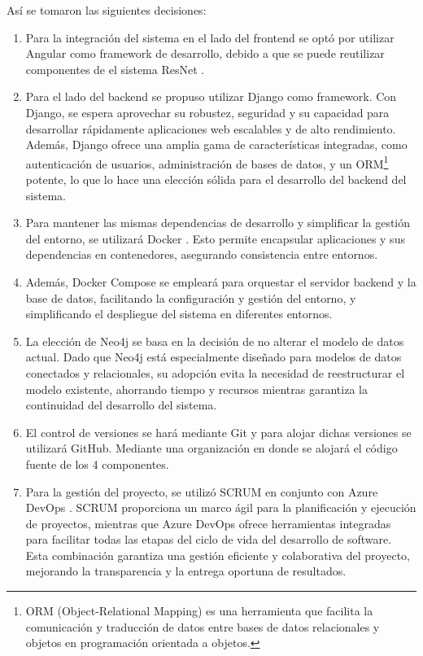 \begin{itemize}
    Así se tomaron las siguientes decisiones:
    \begin{enumerate}
        \item Para la integración del sistema  en el lado del frontend se optó por utilizar Angular como framework de desarrollo, debido a que se puede reutilizar componentes de el sistema ResNet \cite{RESNET}. 
        \item Para el lado del backend se propuso utilizar Django como framework. Con Django, se espera aprovechar su robustez, seguridad y su capacidad para desarrollar rápidamente aplicaciones web escalables y de alto rendimiento. Además, Django ofrece una amplia gama de características integradas, como autenticación de usuarios, administración de bases de datos, y un ORM\footnote{ORM (Object-Relational Mapping) es una herramienta que facilita la comunicación y traducción de datos entre bases de datos relacionales y objetos en programación orientada a objetos.} potente, lo que lo hace una elección sólida para el desarrollo del backend del sistema. 
        \item Para mantener las mismas dependencias de desarrollo y simplificar la gestión del entorno, se utilizará Docker \cite{DOCKER}. Esto permite encapsular aplicaciones y sus dependencias en contenedores, asegurando consistencia entre entornos.
        \item Además, Docker Compose se empleará para orquestar el servidor backend y la base de datos, facilitando la configuración y gestión del entorno, y simplificando el despliegue del sistema en diferentes entornos.
        \item La elección de Neo4j se basa en la decisión de no alterar el modelo de datos actual. Dado que Neo4j está especialmente diseñado para modelos de datos conectados y relacionales, su adopción evita la necesidad de reestructurar el modelo existente, ahorrando tiempo y recursos mientras garantiza la continuidad del desarrollo del sistema.
        \item El control de versiones se hará mediante Git y para alojar dichas versiones se utilizará GitHub. Mediante una organización en donde se alojará el código fuente de los 4 componentes.
        \item Para la gestión del proyecto, se utilizó SCRUM en conjunto con Azure DevOps \cite{AZURE-DEVOPS}. SCRUM proporciona un marco ágil para la planificación y ejecución de proyectos, mientras que Azure DevOps \cite{AZURE-DEVOPS} ofrece herramientas integradas para facilitar todas las etapas del ciclo de vida del desarrollo de software. Esta combinación garantiza una gestión eficiente y colaborativa del proyecto, mejorando la transparencia y la entrega oportuna de resultados.

\end{enumerate}
\end{itemize}

